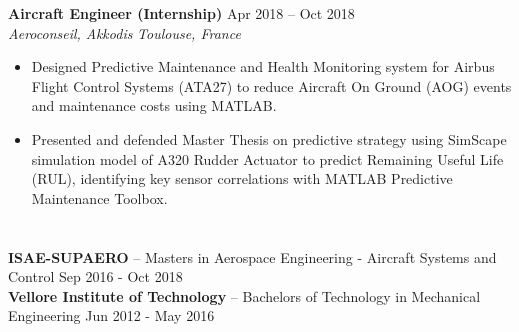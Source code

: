 \documentclass[9pt]{article}        %
\begin{document}
\textbf{Aircraft Engineer (Internship)} \hfill {Apr 2018 – Oct 2018}\\
\textit{Aeroconseil, Akkodis} \hfill \textit{Toulouse, France} 
\begin{itemize}
  \item Designed Predictive Maintenance and Health Monitoring system for Airbus Flight Control Systems (ATA27) to reduce Aircraft On Ground (AOG) events and maintenance costs using MATLAB.
  \item Presented and defended Master Thesis on predictive strategy using SimScape simulation model of A320 Rudder Actuator to predict Remaining Useful Life (RUL), identifying key sensor correlations with MATLAB Predictive Maintenance Toolbox.
\end{itemize}






\section*{{\fontsize{12}{14.4}\selectfont{}}{\fontsize{9}{10.8}\selectfont{}}}
\textbf{ISAE-SUPAERO} -- Masters in Aerospace Engineering - Aircraft Systems and Control \hfill Sep 2016 - Oct 2018 \\
\textbf{Vellore Institute of Technology} -- Bachelors of Technology in Mechanical Engineering \hfill Jun 2012 - May 2016

\end{document}
